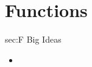 \chapter{Functions}
\label{chap:F}

\begin{bigideas}{sec:F Big Ideas}
\begin{itemize}
  \item 
\end{itemize}
\end{bigideas}